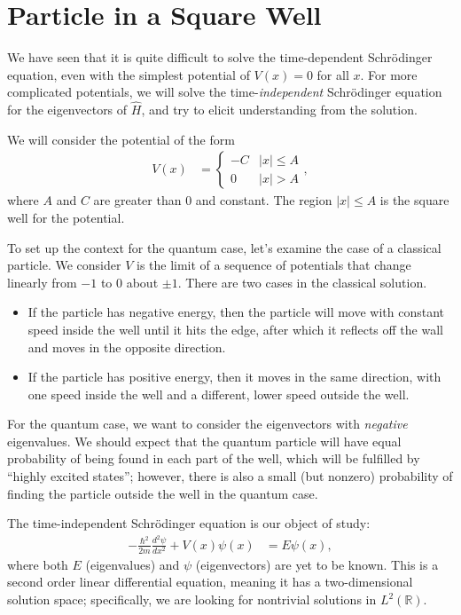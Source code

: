 \documentclass[12pt]{extarticle}
\newcommand{\R}{\mathbb{R}}
\theoremstyle{plain}
\theoremstyle{definition}
\theoremstyle{remark}
\renewcommand{\newline}{\hfill\break}
\begin{document}
  \section{Particle in a Square Well}%
  We have seen that it is quite difficult to solve the time-dependent Schrödinger equation, even with the simplest potential of $V(x) = 0$ for all $x$. For more complicated potentials, we will solve the time-\textit{independent} Schrödinger equation for the eigenvectors of $\hat{H}$, and try to elicit understanding from the solution.\newline

  We will consider the potential of the form
  \begin{align*}
    V(x) &= \begin{cases}
      -C & |x| \leq A\\
      0 & |x| > A
    \end{cases},
  \end{align*}
  where $A$ and $C$ are greater than $0$ and constant. The region $|x| \leq A$ is the square well for the potential.\newline

  To set up the context for the quantum case, let's examine the case of a classical particle. We consider $V$ is the limit of a sequence of potentials that change linearly from $-1$ to $0$ about $\pm 1$. There are two cases in the classical solution.
  \begin{itemize}
    \item If the particle has negative energy, then the particle will move with constant speed inside the well until it hits the edge, after which it reflects off the wall and moves in the opposite direction.
    \item If the particle has positive energy, then it moves in the same direction, with one speed inside the well and a different, lower speed outside the well.
  \end{itemize}
  For the quantum case, we want to consider the eigenvectors with \textit{negative} eigenvalues. We should expect that the quantum particle will have equal probability of being found in each part of the well, which will be fulfilled by ``highly excited states''; however, there is also a small (but nonzero) probability of finding the particle outside the well in the quantum case.\newline

  The time-independent Schrödinger equation is our object of study:
  \begin{align*}
    -\frac{\hbar^2}{2m}\frac{d ^2\psi}{d x^2} + V(x)\psi(x) &= E\psi(x),
  \end{align*}
  where both $E$ (eigenvalues) and $\psi$ (eigenvectors) are yet to be known. This is a second order linear differential equation, meaning it has a two-dimensional solution space; specifically, we are looking for nontrivial solutions in $L^{2}(\R)$.
\end{document}
